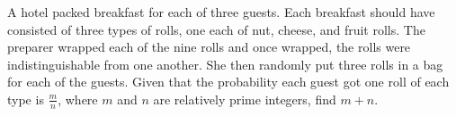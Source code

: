 A hotel packed breakfast for each of three guests. Each breakfast should have consisted of three types of rolls, one each of nut, cheese, and fruit rolls. The preparer wrapped each of the nine rolls and once wrapped, the rolls were indistinguishable from one another. She then randomly put three rolls in a bag for each of the guests. Given that the probability each guest got one roll of each type is $\frac{m}{n}$, where $m$ and $n$ are relatively prime integers, find $m+n$.